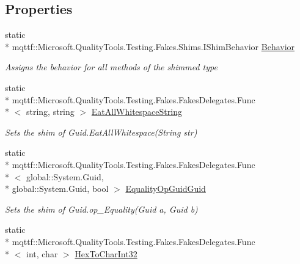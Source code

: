 \subsection*{Properties}
\begin{DoxyCompactItemize}
\item 
static \\*
mqttf\-::\-Microsoft.\-Quality\-Tools.\-Testing.\-Fakes.\-Shims.\-I\-Shim\-Behavior \hyperlink{class_system_1_1_fakes_1_1_shim_guid_aad68a6232be9d7515ea3d757688bb697}{Behavior}
\begin{DoxyCompactList}\small\item\em Assigns the behavior for all methods of the shimmed type\end{DoxyCompactList}\item 
static \\*
mqttf\-::\-Microsoft.\-Quality\-Tools.\-Testing.\-Fakes.\-Fakes\-Delegates.\-Func\\*
$<$ string, string $>$ \hyperlink{class_system_1_1_fakes_1_1_shim_guid_ad38ad5e2b183cbac68706a87e362815c}{Eat\-All\-Whitespace\-String}
\begin{DoxyCompactList}\small\item\em Sets the shim of Guid.\-Eat\-All\-Whitespace(\-String str)\end{DoxyCompactList}\item 
static \\*
mqttf\-::\-Microsoft.\-Quality\-Tools.\-Testing.\-Fakes.\-Fakes\-Delegates.\-Func\\*
$<$ global\-::\-System.\-Guid, \\*
global\-::\-System.\-Guid, bool $>$ \hyperlink{class_system_1_1_fakes_1_1_shim_guid_a964dd0947efe8543306deeddaa44b9c5}{Equality\-Op\-Guid\-Guid}
\begin{DoxyCompactList}\small\item\em Sets the shim of Guid.\-op\-\_\-\-Equality(\-Guid a, Guid b)\end{DoxyCompactList}\item 
static \\*
mqttf\-::\-Microsoft.\-Quality\-Tools.\-Testing.\-Fakes.\-Fakes\-Delegates.\-Func\\*
$<$ int, char $>$ \hyperlink{class_system_1_1_fakes_1_1_shim_guid_a2283a6468909a1d013542fe70c55eac0}{Hex\-To\-Char\-Int32}

\end{DoxyCompactItemize}
